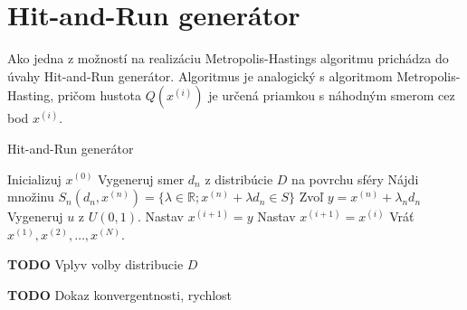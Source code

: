 \section{Hit-and-Run generátor}

Ako jedna z možností na realizáciu Metropolis-Hastings algoritmu prichádza do úvahy Hit-and-Run generátor. Algoritmus je analogický s algoritmom Metropolis-Hasting, pričom hustota $Q(x^{(i)})$ je určená priamkou s náhodným smerom cez bod $x^{(i)}$.

\begin{algorithm}[H]
	\caption{Hit-and-Run generátor \cite{hit-and-run_chen}}
	\label{hit-and-run}
	\begin{algorithmic}[1]
		\State Inicializuj $x^{(0)}$
			\State Vygeneruj smer $d_n$ z distribúcie $D$ na povrchu sféry
			\State Nájdi množinu $S_n(d_n,x^{(n)})=\{\lambda \in \mathbb{R}; x^{(n)} + \lambda d_n \in S \} $
			\State Zvoľ $y=x^{(n)}+\lambda_n d_n$
			\State Vygeneruj $u$ z $U(0,1)$.
				\State Nastav $x^{(i+1)}=y$
			\Else
				\State Nastav $x^{(i+1)}=x^{(i)}$
			\EndIf
		\EndFor
		\State Vráť $x^{(1)},x^{(2)},\dots,x^{(N)}$.
	\end{algorithmic}
\end{algorithm}

\textbf{TODO} Vplyv volby distribucie $D$

\textbf{TODO} Dokaz konvergentnosti, rychlost \cite{hit-and-run_chen}
